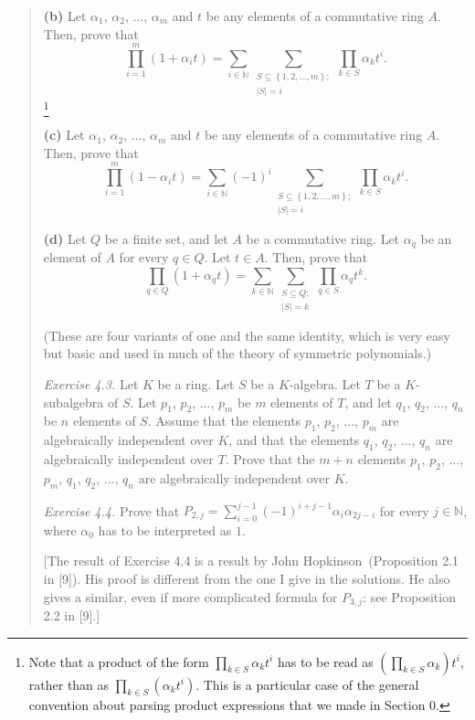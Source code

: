 \documentclass[numbers=enddot,12pt,final,onecolumn,notitlepage]{scrartcl}%
\begin{document}
\begin{quotation}
\textbf{(b)} Let $\alpha_{1}$, $\alpha_{2}$, $...$, $\alpha_{m}$ and $t$ be
any elements of a commutative ring $A$. Then, prove that%
\[
\prod\limits_{i=1}^{m}\left(  1+\alpha_{i}t\right)  =\sum\limits_{i\in
\mathbb{N}}\sum\limits_{\substack{S\subseteq\left\{  1,2,...,m\right\}
;\\\left\vert S\right\vert =i}}\prod\limits_{k\in S}\alpha_{k}t^{i}.
\]
\footnote{Note that a product of the form $\prod\limits_{k\in S}\alpha
_{k}t^{i}$ has to be read as $\left(  \prod\limits_{k\in S}\alpha_{k}\right)
t^{i}$, rather than as $\prod\limits_{k\in S}\left(  \alpha_{k}t^{i}\right)
$. This is a particular case of the general convention about parsing product
expressions that we made in Section 0.}

\textbf{(c)} Let $\alpha_{1}$, $\alpha_{2}$, $...$, $\alpha_{m}$ and $t$ be
any elements of a commutative ring $A$. Then, prove that%
\[
\prod\limits_{i=1}^{m}\left(  1-\alpha_{i}t\right)  =\sum\limits_{i\in
\mathbb{N}}\left(  -1\right)  ^{i}\sum\limits_{\substack{S\subseteq\left\{
1,2,...,m\right\}  ;\\\left\vert S\right\vert =i}}\prod\limits_{k\in S}%
\alpha_{k}t^{i}.
\]


\textbf{(d)} Let $Q$ be a finite set, and let $A$ be a commutative ring. Let
$\alpha_{q}$ be an element of $A$ for every $q\in Q$. Let $t\in A$. Then,
prove that%
\[
\prod\limits_{q\in Q}\left(  1+\alpha_{q}t\right)  =\sum\limits_{k\in
\mathbb{N}}\sum\limits_{\substack{S\subseteq Q;\\\left\vert S\right\vert
=k}}\prod\limits_{q\in S}\alpha_{q}t^{k}.
\]


(These are four variants of one and the same identity, which is very easy but
basic and used in much of the theory of symmetric polynomials.)

\textit{Exercise 4.3.} Let $K$ be a ring. Let $S$ be a $K$-algebra. Let $T$ be
a $K$-subalgebra of $S$. Let $p_{1}$, $p_{2}$, $...$, $p_{m}$ be $m$ elements
of $T$, and let $q_{1}$, $q_{2}$, $...$, $q_{n}$ be $n$ elements of $S$.
Assume that the elements $p_{1}$, $p_{2}$, $...$, $p_{m}$ are algebraically
independent over $K$, and that the elements $q_{1}$, $q_{2}$, $...$, $q_{n}$
are algebraically independent over $T$. Prove that the $m+n$ elements $p_{1}$,
$p_{2}$, $...$, $p_{m}$, $q_{1}$, $q_{2}$, $...$, $q_{n}$ are algebraically
independent over $K$.

\textit{Exercise 4.4.} Prove that $P_{2,j}=\sum\limits_{i=0}^{j-1}\left(
-1\right)  ^{i+j-1}\alpha_{i}\alpha_{2j-i}$ for every $j\in\mathbb{N}$, where
$\alpha_{0}$ has to be interpreted as $1$.

[The result of Exercise 4.4 is a result by John Hopkinson\ (Proposition 2.1 in
[9]). His proof is different from the one I give in the solutions. He also
gives a similar, even if more complicated formula for $P_{3,j}$: see
Proposition 2.2 in [9].]
\end{quotation}
\end{document}
